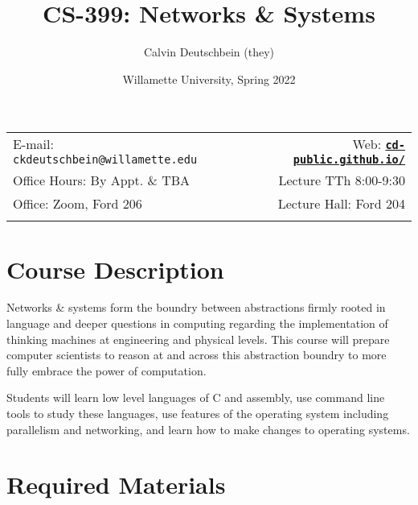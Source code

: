 \documentclass[11pt]{article}
\title{CS-399: Networks \& Systems}
\author{Calvin Deutschbein (they)}
\date{Willamette University, Spring 2022}
\newcommand{\blankline}{\quad\pagebreak[2]}
\begin{document}
\maketitle

\blankline

\begin{tabular*}{.93\textwidth}{@{\extracolsep{\fill}}lr}


E-mail: \texttt{ckdeutschbein@willamette.edu} & Web: \href{https://cd-public.github.io/courses/computer_security/451f21.html}{\tt\bf cd-public.github.io/}  \\

 Office Hours: By Appt. \& TBA  &  Lecture TTh 8:00-9:30 \\

 Office: Zoom, Ford 206 & Lecture Hall: Ford 204 \\
 & \\
\hline
\end{tabular*}

\vspace{5 mm}


\section*{Course Description}

 Networks \& systems form the boundry between abstractions firmly rooted in language and deeper questions in computing regarding the implementation of thinking machines at engineering and physical levels. This course will prepare computer scientists to reason at and across this abstraction boundry to more fully embrace the power of computation.

Students will learn low level languages of C and assembly, use command line tools to study these languages, use features of the operating system including parallelism and networking, and learn how to make changes to operating systems. 


\section*{Required Materials}
\end{document}
